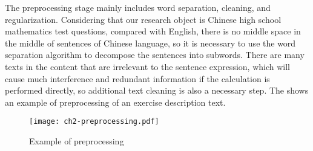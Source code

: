 
The preprocessing stage mainly includes word separation, cleaning, and regularization. Considering that our research object is Chinese high school mathematics test questions, compared with English, there is no middle space in the middle of sentences of Chinese language, so it is necessary to use the word separation algorithm to decompose the sentences into subwords. There are many texts in the content that are irrelevant to the sentence expression, which will cause much interference and redundant information if the calculation is performed directly, so additional text cleaning is also a necessary step. The \figname{\ref{fig:ch2-model-preprocessing}} shows an example of preprocessing of an exercise description text.

\begin{figure}[htbp!]
    \centering
    \texttt{[image: ch2-preprocessing.pdf]}
    \caption{Example of preprocessing}\label{fig:ch2-model-preprocessing}
\end{figure}


